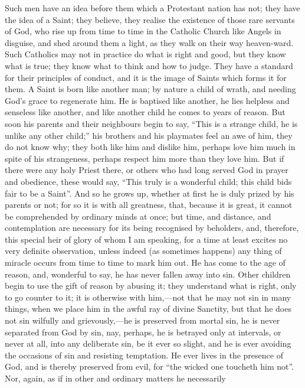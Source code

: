 Such men have an idea before them which a Protestant nation has
not; they have the idea of a Saint; they believe, they realise the
existence of those rare servants of God, who rise up from time to time
in the Catholic Church like Angels in disguise, and shed around them a
light, as they walk on their way heaven-ward. Such Catholics may not
in practice do what is right and good, but they know what is true;
they know what to think and how to judge. They have a standard for
their principles of conduct, and it is the image of Saints which forms
it for them. A Saint is born like another man; by nature a child of
wrath, and needing God's grace to regenerate him. He is baptised like
another, he lies helpless and senseless like another, and like another
child he comes to years of reason. But soon his parents and their
neighbours begin to say, ``This is a strange child, he is unlike
any other child;'' his brothers and his playmates feel an awe of
him, they do not know why; they both like him and dislike him, perhaps
love him much in spite of his strangeness, perhaps respect him more
than they love him. But if there were any holy Priest there, or others
who had long served God in prayer and obedience, these would say,
``This truly is a wonderful child; this child bids fair to be a
Saint''. And so he grows up, whether at first he is duly prized by
his parents or not; for so it is with all greatness, that, because it
is great, it cannot be comprehended by ordinary minds at once; but
time, and distance, and contemplation are necessary for its being
recognised by beholders, and, therefore, this special heir of glory of
whom I am speaking, for a time at least excites no very definite
observation, unless indeed (as sometimes happens) any thing of miracle
occurs from time to time to mark him out. He has come to the age of
reason, and, wonderful to say, he has never fallen away into sin.
Other children begin to use the gift of reason by abusing it; they
understand what is right, only to go counter to it; it is otherwise
with him,—not that he may not sin in many things, when we place him
in the awful ray of divine Sanctity, but that he does not sin wilfully
and grievously,—he is preserved from mortal sin, he is never
separated from God by sin, nay, perhaps, he is betrayed only at
intervals, or never at all, into any deliberate sin, be it ever so
slight, and he is ever avoiding the occasions of sin and resisting
temptation. He ever lives in the presence of God, and is thereby
preserved from evil, for ``the wicked one toucheth him not''.
Nor, again, as if in other and ordinary matters he necessarily
